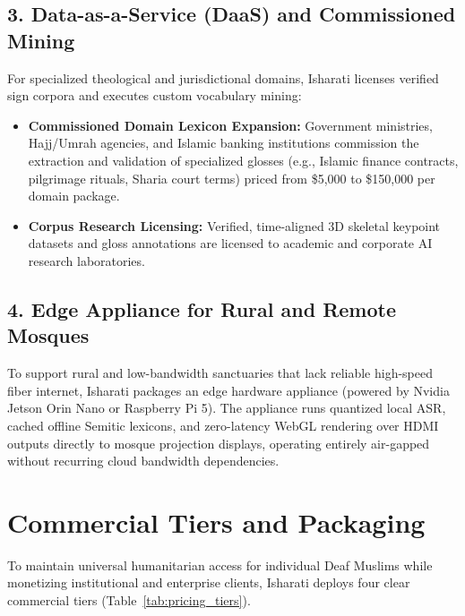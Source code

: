 \subsection{3. Data-as-a-Service (DaaS) and Commissioned Mining}
For specialized theological and jurisdictional domains, Isharati licenses verified sign corpora and executes custom vocabulary mining:
\begin{itemize}[leftmargin=*,itemsep=2pt]
  \item \textbf{Commissioned Domain Lexicon Expansion:} Government ministries, Hajj/Umrah agencies, and Islamic banking institutions commission the extraction and validation of specialized glosses (e.g., Islamic finance contracts, pilgrimage rituals, Sharia court terms) priced from \$5,000 to \$150,000 per domain package.
  \item \textbf{Corpus Research Licensing:} Verified, time-aligned 3D skeletal keypoint datasets and gloss annotations are licensed to academic and corporate AI research laboratories.
\end{itemize}

\subsection{4. Edge Appliance for Rural and Remote Mosques}
To support rural and low-bandwidth sanctuaries that lack reliable high-speed fiber internet, Isharati packages an edge hardware appliance (powered by Nvidia Jetson Orin Nano or Raspberry Pi 5). The appliance runs quantized local ASR, cached offline Semitic lexicons, and zero-latency WebGL rendering over HDMI outputs directly to mosque projection displays, operating entirely air-gapped without recurring cloud bandwidth dependencies.

\section{Commercial Tiers and Packaging}
\label{sec:biz_tiers}
To maintain universal humanitarian access for individual Deaf Muslims while monetizing institutional and enterprise clients, Isharati deploys four clear commercial tiers (Table~\ref{tab:pricing_tiers}).

